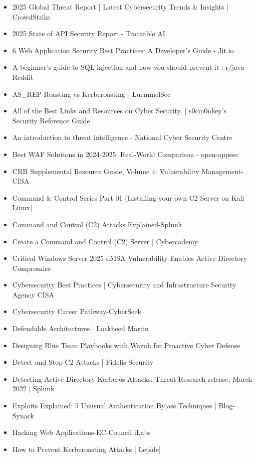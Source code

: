 \begin{itemize}
    \item 2025 Global Threat Report | Latest Cybersecurity Trends \& Insights | CrowdStrike
    \item 2025 State of API Security Report - Traceable AI
    \item 6 Web Application Security Best Practices: A Developer's Guide - Jit.io
    \item A beginner's guide to SQL injection and how you should prevent it : r/java - Reddit
    \item AS\_REP Roasting vs Kerberoasting - LuemmelSec
    \item All of the Best Links and Resources on Cyber Security. | s0cm0nkey's Security Reference Guide
    \item An introduction to threat intelligence - National Cyber Security Centre
    \item Best WAF Solutions in 2024-2025: Real-World Comparison - open-appsec
    \item CRR Supplemental Resource Guide, Volume 4: Vulnerability Management-CISA
    \item Command \& Control Series Part 01 (Installing your own C2 Server on Kali Linux)
    \item Command and Control (C2) Attacks Explained-Splunk
    \item Create a Command and Control (C2) Server | Cybercademy
    \item Critical Windows Server 2025 dMSA Vulnerability Enables Active Directory Compromise
    \item Cybersecurity Best Practices | Cybersecurity and Infrastructure Security Agency CISA
    \item Cybersecurity Career Pathway-CyberSeek
    \item Defendable Architectures | Lockheed Martin
    \item Designing Blue Team Playbooks with Wazuh for Proactive Cyber Defense
    \item Detect and Stop C2 Attacks | Fidelis Security
    \item Detecting Active Directory Kerberos Attacks: Threat Research release, March 2022 | Splunk
    \item Exploits Explained: 5 Unusual Authentication By[ass Techniques | Blog-Synack
    \item Hacking Web Applications-EC-Council iLabs
    \item How to Prevent Kerberoasting Attacks | Lepide]

\end{itemize}
